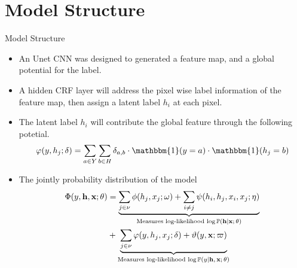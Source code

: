 \documentclass[leqno]{beamer}
\newcommand{\PP}{{\mathbb{P}}}
\newcommand{\hb}{\mathbf{h}}
\newcommand{\xb}{\mathbf{x}}
\newcommand{\one}{\mathbbm{1}}
\begin{document}
\section[Model Structure]{Model Structure}


\begin{frame}{Model Structure}
\begin{small}
\begin{itemize}
\item An Unet CNN was designed to generated a feature map, and a global
potential for the label.
\item A hidden CRF layer will address the pixel wise label information of the
feature map, then assign a latent label $h_i$ at each pixel.
\item The latent label $h_i$ will contribute the global feature through the
following potetial.
\begin{equation*}
\varphi(y, h_{j}; \delta) = \sum_{a \in Y} \sum_{b \in H} \delta_{a, b}
\cdot \one(y = a) \cdot \one(h_j = b)
\end{equation*}
\item The jointly probability distribution of the model
\begin{equation*}
\begin{split}
\Phi(y, \hb, \xb; \theta) &= \underbrace{
\sum_{j \in \nu} \phi(h_j, x_j; \omega)
+ \sum_{i \neq j} \psi(h_i, h_j, x_i, x_j; \eta)}_{
\textrm{Measures log-likelihood $\log\PP(\hb \vert \xb; \theta)$}} \\
&+ \underbrace{
\sum_{j \in \nu} \varphi(y, h_j, x_j; \delta) + \vartheta(y, \xb; \varpi)}_{
\textrm{Measures log-likelihood $\log\PP(y \vert \hb, \xb; \theta)$}}
\end{split}
\end{equation*}
\end{itemize}
\end{small}
\end{frame}
\end{document}
